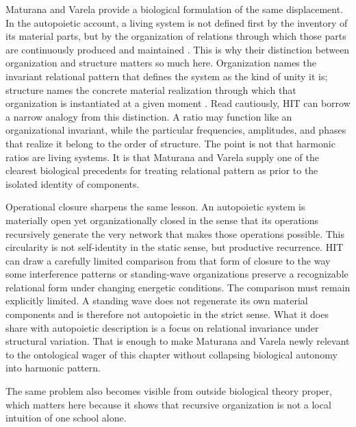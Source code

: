 Maturana and Varela provide a biological formulation of the same displacement. In the autopoietic account, a living system is not defined first by the inventory of its material parts, but by the organization of relations through which those parts are continuously produced and maintained \parencite{maturana_varela_1980,varela_maturana_uribe_1974}. This is why their distinction between organization and structure matters so much here. Organization names the invariant relational pattern that defines the system as the kind of unity it is; structure names the concrete material realization through which that organization is instantiated at a given moment \parencite{maturana_1970,varela_1979}. Read cautiously, HIT can borrow a narrow analogy from this distinction. A ratio may function like an organizational invariant, while the particular frequencies, amplitudes, and phases that realize it belong to the order of structure. The point is not that harmonic ratios are living systems. It is that Maturana and Varela supply one of the clearest biological precedents for treating relational pattern as prior to the isolated identity of components.

Operational closure sharpens the same lesson. An autopoietic system is materially open yet organizationally closed in the sense that its operations recursively generate the very network that makes those operations possible. This circularity is not self-identity in the static sense, but productive recurrence. HIT can draw a carefully limited comparison from that form of closure to the way some interference patterns or standing-wave organizations preserve a recognizable relational form under changing energetic conditions. The comparison must remain explicitly limited. A standing wave does not regenerate its own material components and is therefore not autopoietic in the strict sense. What it does share with autopoietic description is a focus on relational invariance under structural variation. That is enough to make Maturana and Varela newly relevant to the ontological wager of this chapter without collapsing biological autonomy into harmonic pattern.

The same problem also becomes visible from outside biological theory proper, which matters here because it shows that recursive organization is not a local intuition of one school alone.

